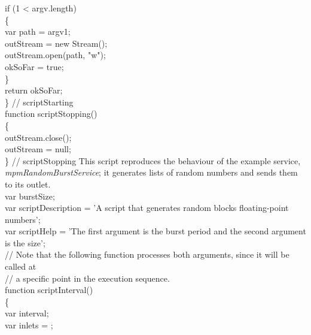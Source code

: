 \tS{}if (1 < argv.length)\\
\tS\{\\
\tS\tS{}var path = argv\openSq{}1\closeSq;\\
        
\tS\tS{}outStream = new Stream();\\
\tS\tS{}outStream.open(path, "w");\\
\tS\tS{}okSoFar = true;\\
\tS\}\\
\tS{}return okSoFar;\\
\} // scriptStarting\\

function scriptStopping()\\
\{\\
\tS{}outStream.close();\\
\tS{}outStream = null;\\
\} // scriptStopping
\codeEnd{}
\secondaryEnd{}
\newpage
{}
This script reproduces the behaviour of the example service, \emph{mpmRandomBurstService};
it generates lists of random numbers and sends them to its outlet.\\

\codeBegin{}
var burstSize;\\

var scriptDescription = 'A script that generates random blocks floating-point numbers';\\

var scriptHelp = 'The first argument is the burst period and the second argument is the
size';\\

// Note that the following function processes both arguments, since it will be called at\\
// a specific point in the execution sequence.\\
function scriptInterval()\\
\{\\
\tS{}var interval;\\
\tS{}var inlets = \openSq\closeSq;\\
    
